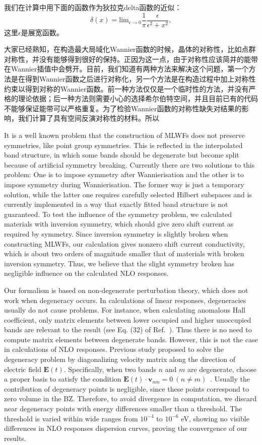 我们在计算中用下面的函数作为狄拉克delta函数的近似：
\[
\delta(x) = \text{lim}_{\epsilon\to0}\frac{1}{\pi}\frac{\epsilon}{\epsilon^{2}+x^{2}},
\]
这里$\epsilon$是展宽函数。

大家已经熟知，在构造最大局域化Wannier函数的时候，晶体的对称性，比如点群对称性，并没有能够得到很好的保持。正因为这一点，由于对称性应该简并的能带在Wannier插值中会劈开。目前，我们知道有两种方法来解决这个问题，第一个方法是在得到Wannier函数之后进行对称化，另一个方法是在构造过程中加上对称性约束以得到对称的Wannier函数。前一种方法仅仅是一个临时性的方法，并没有严格的理论依据；后一种方法则需要小心的选择希尔伯特空间，并且目前已有的代码不能够保证能带可以严格重复。为了检验Wannier函数的对称性缺失对结果的影响，我们计算了具有空间反演对称性的材料。所以

It is a well known problem that the construction of MLWFs does not preserve symmetries, like point group symmetries. This is reflected in the interpolated band structure, in which some bands should be degenerate but become split because of artificial symmetry breaking. Currently there are two solutions to this problem: One is to impose symmetry after Wannierisation and the other is to impose symmetry during Wannierisation\cite{sakuma_symmetry-adapted_2013}. The former way is just a temporary solution, while the latter one requires carefully selected Hilbert subspaces and is currently implemented in a way that exactly fitted band structure is not guaranteed. To test the influence of the symmetry problem, we calculated materials with inversion symmetry, which should give zero shift current as required by symmetry. Since inversion symmetry is slightly broken when constructing MLWFs, our calculation gives nonzero shift current conductivity, which is about two orders of magnitude smaller that of materials with broken inversion symmetry. Thus, we believe that the slight symmetry broken has negligible influence on the calculated NLO responses.

Our formalism is based on non-degenerate perturbation theory, which does not work when degeneracy occurs. In calculations of linear responses, degeneracies usually do not cause problems. For instance, when calculating anomalous Hall coefficient, only matrix elements between lower occupied and higher unoccupied bands are relevant to the result (see Eq. (32) of Ref.~). Thus there is no need to compute matrix elements between degenerate bands. However, this is not the case in calculations of NLO responses. Previous study proposed to solve the degeneracy problem by diagonalizing velocity matrix along the direction of electric field $\mathbf{E}(t)$. Specifically, when two bands $n$ and $m$ are degenerate, choose a proper basis to satisfy the condition $\mathbf{E}(t)\cdot\mathbf{v}_{nm}=0  \ (n\ne m)$~\cite{sipe_second-order_2000}. Usually the contribution of degeneracy points is negligible, since these points correspond to zero volume in the BZ. Therefore, to avoid divergence in computation, we discard near degeneracy points with energy differences smaller than a threshold. The threshold is varied within wide ranges from $10^{-4}$ to $10^{-6}$ eV, showing no visible differences in NLO responses dispersion curves, proving the convergence of our results.
